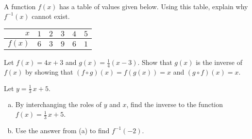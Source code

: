 \documentclass[11pt,letterpaper]{article}
\begin{document}

 A function $f(x)$ has a table of values given below. Using this table, explain why $f^{-1}(x)$ cannot exist. \par
	\begin{table}[!ht]
	\centering
	\begin{tabular}{|r||c|c|c|c|c|} \hline
	$x$ & $1$ & $2$ & $3$ & $4$ & $5$ \\ \hline
	$f(x)$ & $6$ & $3$ & $9$ & $6$ & $1$ \\ \hline
	\end{tabular}
	\end{table}



\newpage



 Let $f(x)= 4x + 3$ and $g(x)= \frac{1}{4}(x - 3)$. Show that $g(x)$ is the inverse of $f(x)$ by showing that $(f \circ g)(x)= f(g(x))= x$ and $(g \circ f)(x)= x$. 



\newpage



 Let $y= \frac{1}{3}\,x + 5$.
	\begin{enumerate}[(a)]
	\item By interchanging the roles of $y$ and $x$, find the inverse to the function $f(x)= \frac{1}{3}\,x + 5$.
	\item Use the answer from (a) to find $f^{-1}(-2)$. 
	\end{enumerate}
\end{document}
